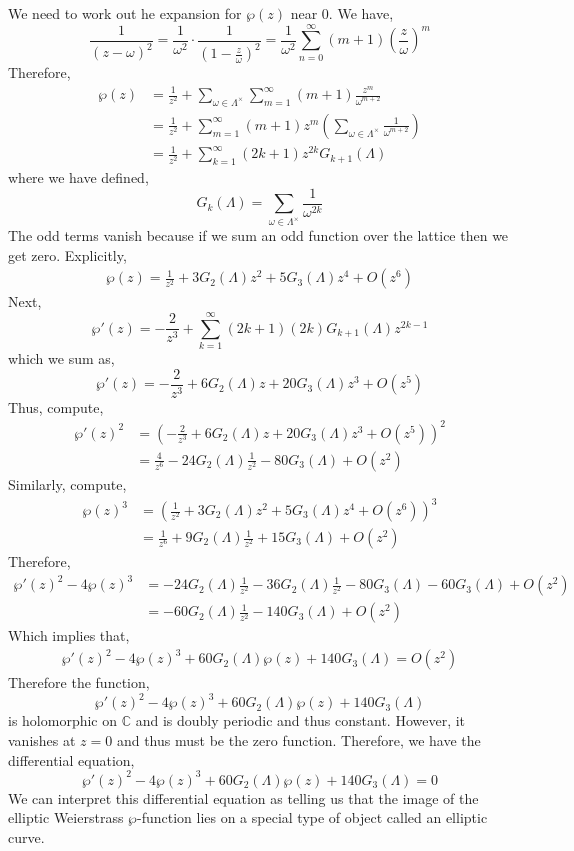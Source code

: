 \documentclass{article}
\newcommand{\C}{\mathbb{C}}
\theoremstyle{definition}
\begin{document}
We need to work out he expansion for $\wp(z)$ near $0$. We have,
\[ \frac{1}{(z - \omega)^2} = \frac{1}{\omega^2} \cdot \frac{1}{(1 - \frac{z}{\omega})^2} = \frac{1}{\omega^2} \sum_{n = 0}^\infty (m + 1) \left( \frac{z}{\omega} \right)^m \]
Therefore,
\begin{align*}
\wp(z) &= \frac{1}{z^2} + \sum_{\omega \in \Lambda^\times} \sum_{m = 1}^\infty (m + 1) \frac{z^{m}}{\omega^{m + 2}} 
\\
& = \frac{1}{z^2} + \sum_{m = 1}^\infty (m + 1) z^m \left( \sum_{\omega \in \Lambda^\times} \frac{1}{\omega^{m+2}} \right) 
\\
& = \frac{1}{z^2} + \sum_{k = 1}^\infty (2 k + 1) z^{2k} G_{k+1}(\Lambda) 
\end{align*}
where we have defined,
\[ G_{k}(\Lambda) = \sum_{\omega \in \Lambda^\times} \frac{1}{\omega^{2k}} \] 
The odd terms vanish because if we sum an odd function over the lattice then we get zero. 
Explicitly,
\begin{align*}
\wp(z) = \frac{1}{z^2} + 3 G_2(\Lambda) z^2 + 5 G_3(\Lambda) z^4 + O(z^6) 
\end{align*}
Next,
\[ \wp'(z) = - \frac{2}{z^3} + \sum_{k = 1}^\infty (2 k + 1) (2k) G_{k+1}(\Lambda) z^{2k - 1} \]
which we sum as,
\[ \wp'(z) = - \frac{2}{z^3} + 6 G_2(\Lambda) z + 20 G_3(\Lambda) z^3 + O(z^5) \]
Thus, compute,
\begin{align*}
\wp'(z)^2 & = \left(  - \frac{2}{z^3} + 6 G_2(\Lambda) z + 20 G_3(\Lambda) z^3 + O(z^5) \right)^2 
\\
& = \frac{4}{z^6} - 24 G_2(\Lambda) \frac{1}{z^2} - 80 G_3(\Lambda) + O(z^2) 
\end{align*}
Similarly, compute,
\begin{align*}
\wp(z)^3 & = \left( \frac{1}{z^2} + 3 G_2(\Lambda) z^2 + 5 G_3(\Lambda) z^4 + O(z^6) \right)^3
\\
& = \frac{1}{z^6} + 9 G_2(\Lambda) \frac{1}{z^2} + 15 G_3(\Lambda) + O(z^2) 
\end{align*}
Therefore,
\begin{align*}
\wp'(z)^2 - 4 \wp(z)^3 & = - 24 G_2(\Lambda) \frac{1}{z^2} - 36 G_2(\Lambda) \frac{1}{z^2} - 80 G_3(\Lambda) - 60 G_3(\Lambda) + O(z^2) 
\\
& = - 60 G_2(\Lambda) \frac{1}{z^2} - 140 G_3(\Lambda) + O(z^2)
\end{align*}
Which implies that,
\begin{align*}
\wp'(z)^2 - 4 \wp(z)^3 + 60 G_2(\Lambda) \wp(z) + 140 G_3(\Lambda) = O(z^2)
\end{align*}
Therefore the function,
\[ \wp'(z)^2 - 4 \wp(z)^3 + 60 G_2(\Lambda) \wp(z) + 140 G_3(\Lambda) \]
is holomorphic on $\C$ and is doubly periodic and thus constant. However, it vanishes at $z = 0$ and thus must be the zero function. Therefore, we have the differential equation,
\[ \wp'(z)^2 - 4 \wp(z)^3 + 60 G_2(\Lambda) \wp(z) + 140 G_3(\Lambda)  = 0 \]
We can interpret this differential equation as telling us that the image of the elliptic Weierstrass $\wp$-function lies on a special type of object called an elliptic curve.  
\end{document}
